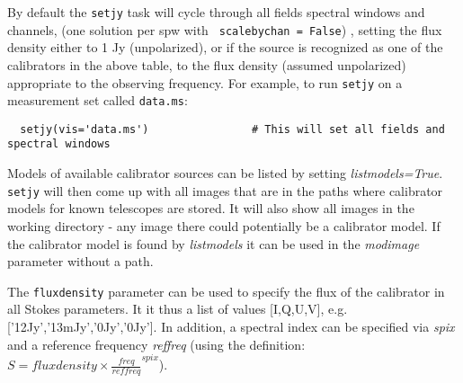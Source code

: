 %




By default the {\tt setjy} task will cycle through all
fields spectral windows and channels, (one solution per spw with {\tt
  scalebychan = False}) , setting the flux density either to 1 Jy
(unpolarized), or if the source is recognized as one of the
calibrators in the above table, to the flux density (assumed
unpolarized) appropriate to the observing frequency.  For example, to
run {\tt setjy} on a measurement set called {\tt data.ms}: \small
\begin{verbatim}
  setjy(vis='data.ms')                # This will set all fields and spectral windows
\end{verbatim}
\normalsize

Models of available calibrator sources can be listed by setting {\it
  listmodels=True}. {\tt setjy} will then come up with all images
that are in the paths where calibrator models for known telescopes are
stored. It will also show all images in the working directory - any
image there could potentially be a calibrator model. If the calibrator
model is found by {\it listmodels} it can be used in the {\it
  modimage} parameter without a path.

The {\tt fluxdensity} parameter can be used to specify the flux of the
calibrator in all Stokes parameters. It it thus a list of values
[I,Q,U,V], e.g. ['12Jy','13mJy','0Jy','0Jy']. In addition, a spectral
index can be specified via {\it spix} and a reference frequency {\it
  reffreq} (using the definition: $S = fluxdensity\times\frac{
  freq}{reffreq}^{spix}$).


